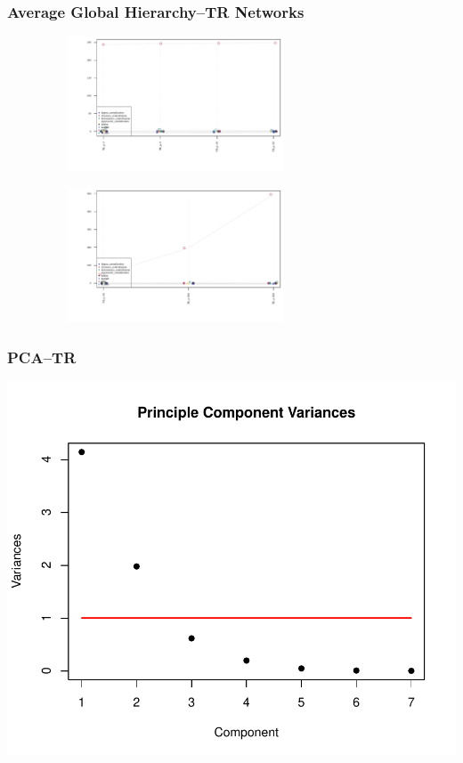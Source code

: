 \documentclass[xcolor={table}]{beamer}
\newenvironment{changemargin}[2]{%
  \begin{list}{}{%
    \setlength{\topsep}{0pt}%
    \setlength{\leftmargin}{#1}%
    \setlength{\rightmargin}{#2}%
    \setlength{\listparindent}{\parindent}%
    \setlength{\itemindent}{\parindent}%
    \setlength{\parsep}{\parskip}%
  }%
  \item[]}{\end{list}}
\begin{document}
\begin{frame}\frametitle{Average Global Hierarchy--TR Networks}
	\begin{changemargin}{-2cm}{ -2cm}
		\centering
		\par
		\includegraphics[width=10cm, height=4cm]{images/TR_Param_Averages.pdf}
		\\
		\vspace{-5mm}
		\par
		\includegraphics[width=10cm, height=4cm]{images/TR_Size_Averages.pdf}
	\end{changemargin}
\end{frame}

\begin{frame}\frametitle{PCA--TR}
	\begin{changemargin}{-2cm}{ -2cm}
		\centering
	\includegraphics[scale = 0.6]{images/TR_Param_PCA_Component_Varinces.pdf}
	\end{changemargin}
\end{frame}
\end{document}
